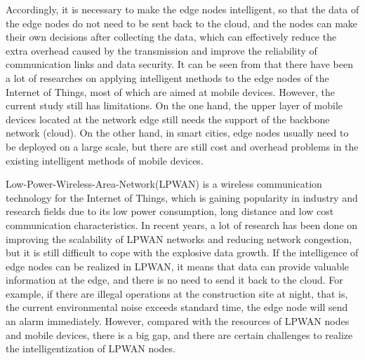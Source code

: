 \documentclass[conference]{IEEEtran}
\begin{document}
	\begin{comment}
		因此，有必要让边缘节点智能化, 这样的话边缘节点的数据不需要回传到云，节点在采集到数据以后就可以自行做出决策，有效降低传输带来的额外开销，提高通信链路的可靠性和数据的安全性。从[]可知目前已有大量研究将智能化的方法用到物联网的边缘节点上，但是，目前的研究依然有局限性。一方面，这些位于网络边缘的移动设备的上层依然需要主干网络（云）的支持，另一方面，智慧城市中，节点通常需要大规模部署，现有的移动端设备智能化方法依然带来成本和开销问题。
	\end{comment}
	
	Accordingly, it is necessary to make the edge nodes intelligent, so that the data of the edge nodes do not need to be sent back to the cloud, and the nodes can make their own decisions after collecting the data, which can effectively reduce the extra overhead caused by the transmission and improve the reliability of communication links and data security. It can be seen from \cite{1234} that there have been a lot of researches on applying intelligent methods to the edge nodes of the Internet of Things, most of which are aimed at mobile devices. However, the current study still has limitations. On the one hand, the upper layer of mobile devices located at the network edge still needs the support of the backbone network (cloud). On the other hand, in smart cities, edge nodes usually need to be deployed on a large scale, but there are still cost and overhead problems in the existing intelligent methods of mobile devices. 
	\begin{comment}
		LPWAN是物联网的一种无线通信技术，由于其低功耗、远距离和低成本的通信特性，在工业和研究领域越来越受欢迎。近年来，针对提高LPWAN网络的可延展性，减少网络拥塞等方面已经有大量研究,但仍然难以应对爆炸式的数据增长。如果在LPWAN实现边缘节点的智能化，意味着数据在前端就可以提供有价值的信息，不需要回传给云了。例如，如果在夜晚建筑工地有违规操作的情况，即当前环境噪声超过标准时，边缘节点立刻发出警报。但是，LPWAN的节点和移动设备的资源相比，有很大的差距, 实现LPWAN节点智能化有一定的挑战。
	\end{comment}

	Low-Power-Wireless-Area-Network(LPWAN)\cite{MEKKI20191} is a wireless communication technology for the Internet of Things, which is gaining popularity in industry and research fields due to its low power consumption, long distance and low cost communication characteristics. In recent years, a lot of research\cite{9259375}\cite{9259397}\cite{9212919} has been done on improving the scalability of LPWAN networks and reducing network congestion, but it is still difficult to cope with the explosive data growth. If the intelligence of edge nodes can be realized in LPWAN, it means that data can provide valuable information at the edge, and there is no need to send it back to the cloud. For example, if there are illegal operations at the construction site at night, that is, the current environmental noise exceeds standard time, the edge node will send an alarm immediately. However, compared with the resources of LPWAN nodes and mobile devices, there is a big gap, and there are certain challenges to realize the intelligentization of LPWAN nodes.
	
\end{document}
